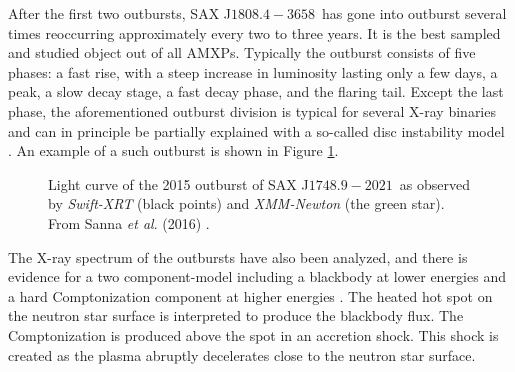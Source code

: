 \documentclass{wihuri}
\def\source{SAX J$1808.4-3658$}
\def\sourceb{SAX J$1748.9-2021$}
\begin{document}

After the first two outbursts, \source \ has gone into outburst several times reoccurring approximately every two to three years. It is the best sampled and studied object out of all AMXPs. Typically the outburst consists of five phases: a fast rise, with a steep increase in luminosity lasting only a few days, a peak, a slow decay stage, a fast decay phase, and the flaring tail. Except the last phase, the aforementioned outburst division is typical for several X-ray binaries and can in principle be partially explained with a so-called disc instability model \cite{disc-instability}. An example of a such outburst is shown in Figure \ref{fig:outburst}. %




\begin{figure}
\centerline{} 
\caption{Light curve of the 2015 outburst of \sourceb \ as observed by {\it Swift-XRT} (black points) and {\it XMM-Newton} (the green star). From Sanna {\it et al}. (2016) \cite{outburst}.}%
\label{fig:outburst}
\end{figure}







The X-ray spectrum of the outbursts have also been analyzed, and there is evidence for a two component-model including a blackbody at lower energies and a hard Comptonization component at higher energies \cite{twocompmod}. %
The heated hot spot on the neutron star surface is interpreted to produce the blackbody flux. The Comptonization is produced above the spot in an accretion shock. This shock is created as the plasma abruptly decelerates close to the neutron star surface. %
\end{document}
